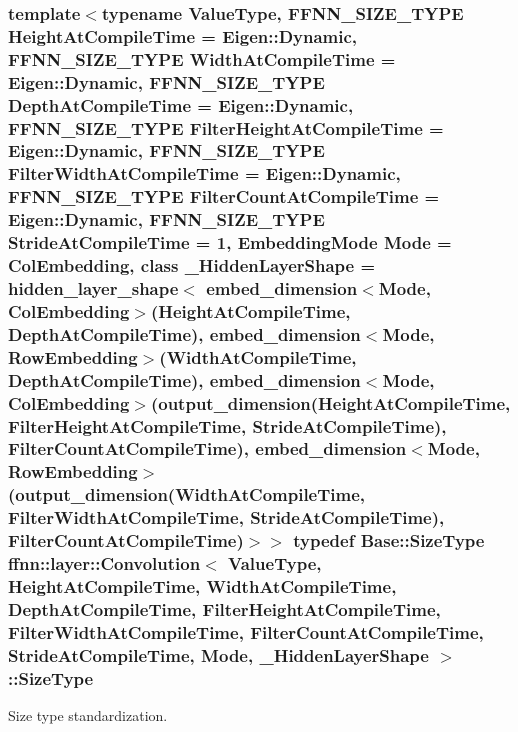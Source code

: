 \hypertarget{classffnn_1_1layer_1_1_convolution_a9599a1f35642eb9b9f516659507ae58d}{
\subsubsection[{Size\-Type}]{\setlength{\rightskip}{0pt plus 5cm}template$<$typename Value\-Type, F\-F\-N\-N\-\_\-\-S\-I\-Z\-E\-\_\-\-T\-Y\-P\-E Height\-At\-Compile\-Time = Eigen\-::\-Dynamic, F\-F\-N\-N\-\_\-\-S\-I\-Z\-E\-\_\-\-T\-Y\-P\-E Width\-At\-Compile\-Time = Eigen\-::\-Dynamic, F\-F\-N\-N\-\_\-\-S\-I\-Z\-E\-\_\-\-T\-Y\-P\-E Depth\-At\-Compile\-Time = Eigen\-::\-Dynamic, F\-F\-N\-N\-\_\-\-S\-I\-Z\-E\-\_\-\-T\-Y\-P\-E Filter\-Height\-At\-Compile\-Time = Eigen\-::\-Dynamic, F\-F\-N\-N\-\_\-\-S\-I\-Z\-E\-\_\-\-T\-Y\-P\-E Filter\-Width\-At\-Compile\-Time = Eigen\-::\-Dynamic, F\-F\-N\-N\-\_\-\-S\-I\-Z\-E\-\_\-\-T\-Y\-P\-E Filter\-Count\-At\-Compile\-Time = Eigen\-::\-Dynamic, F\-F\-N\-N\-\_\-\-S\-I\-Z\-E\-\_\-\-T\-Y\-P\-E Stride\-At\-Compile\-Time = 1, Embedding\-Mode Mode = Col\-Embedding, class \-\_\-\-Hidden\-Layer\-Shape = hidden\-\_\-layer\-\_\-shape$<$              embed\-\_\-dimension$<$\-Mode, Col\-Embedding$>$(\-Height\-At\-Compile\-Time, Depth\-At\-Compile\-Time),              embed\-\_\-dimension$<$\-Mode, Row\-Embedding$>$(\-Width\-At\-Compile\-Time,  Depth\-At\-Compile\-Time),              embed\-\_\-dimension$<$\-Mode, Col\-Embedding$>$(output\-\_\-dimension(\-Height\-At\-Compile\-Time, Filter\-Height\-At\-Compile\-Time, Stride\-At\-Compile\-Time), Filter\-Count\-At\-Compile\-Time),              embed\-\_\-dimension$<$\-Mode, Row\-Embedding$>$(output\-\_\-dimension(\-Width\-At\-Compile\-Time,  Filter\-Width\-At\-Compile\-Time,  Stride\-At\-Compile\-Time), Filter\-Count\-At\-Compile\-Time)$>$$>$ typedef {\bf Base\-::\-Size\-Type} {\bf ffnn\-::layer\-::\-Convolution}$<$ Value\-Type, Height\-At\-Compile\-Time, Width\-At\-Compile\-Time, Depth\-At\-Compile\-Time, Filter\-Height\-At\-Compile\-Time, Filter\-Width\-At\-Compile\-Time, Filter\-Count\-At\-Compile\-Time, Stride\-At\-Compile\-Time, Mode, \-\_\-\-Hidden\-Layer\-Shape $>$\-::{\bf Size\-Type}}}\label{classffnn_1_1layer_1_1_convolution_a9599a1f35642eb9b9f516659507ae58d}


Size type standardization. 



